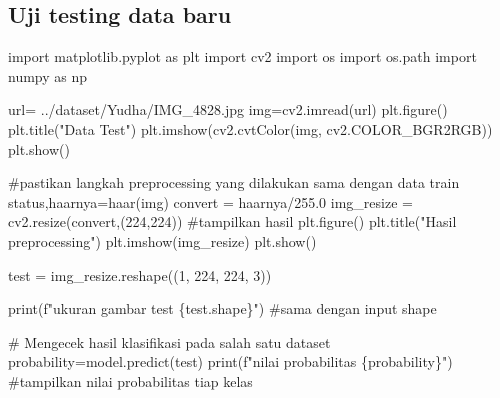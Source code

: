 \documentclass[
  letterpaper,
  DIV=11,
  numbers=noendperiod]{scrreprt}
\newenvironment{Shaded}{\begin{snugshade}}{\end{snugshade}}
\newcommand{\BuiltInTok}[1]{\textcolor[rgb]{0.00,0.23,0.31}{#1}}
\newcommand{\CommentTok}[1]{\textcolor[rgb]{0.37,0.37,0.37}{#1}}
\newcommand{\DecValTok}[1]{\textcolor[rgb]{0.68,0.00,0.00}{#1}}
\newcommand{\FloatTok}[1]{\textcolor[rgb]{0.68,0.00,0.00}{#1}}
\newcommand{\ImportTok}[1]{\textcolor[rgb]{0.00,0.46,0.62}{#1}}
\newcommand{\NormalTok}[1]{\textcolor[rgb]{0.00,0.23,0.31}{#1}}
\newcommand{\OperatorTok}[1]{\textcolor[rgb]{0.37,0.37,0.37}{#1}}
\newcommand{\SpecialCharTok}[1]{\textcolor[rgb]{0.37,0.37,0.37}{#1}}
\newcommand{\SpecialStringTok}[1]{\textcolor[rgb]{0.13,0.47,0.30}{#1}}
\newcommand{\StringTok}[1]{\textcolor[rgb]{0.13,0.47,0.30}{#1}}
\begin{document}
\hypertarget{uji-testing-data-baru-1}{%
\subsection*{Uji testing data baru}\label{uji-testing-data-baru-1}}

\begin{Shaded}
\begin{Highlighting}[]
\ImportTok{import}\NormalTok{ matplotlib.pyplot }\ImportTok{as}\NormalTok{ plt}
\ImportTok{import}\NormalTok{ cv2}
\ImportTok{import}\NormalTok{ os}
\ImportTok{import}\NormalTok{ os.path}
\ImportTok{import}\NormalTok{ numpy }\ImportTok{as}\NormalTok{ np}

\NormalTok{url}\OperatorTok{=} \StringTok{\textquotesingle{}../dataset/Yudha/IMG\_4828.jpg\textquotesingle{}}
\NormalTok{img}\OperatorTok{=}\NormalTok{cv2.imread(url)}
\NormalTok{plt.figure()}
\NormalTok{plt.title(}\StringTok{"Data Test"}\NormalTok{)}
\NormalTok{plt.imshow(cv2.cvtColor(img, cv2.COLOR\_BGR2RGB))}
\NormalTok{plt.show()}

\CommentTok{\#pastikan langkah preprocessing yang dilakukan sama dengan data train}
\NormalTok{status,haarnya}\OperatorTok{=}\NormalTok{haar(img)}
\NormalTok{convert }\OperatorTok{=}\NormalTok{ haarnya}\OperatorTok{/}\FloatTok{255.0}
\NormalTok{img\_resize }\OperatorTok{=}\NormalTok{ cv2.resize(convert,(}\DecValTok{224}\NormalTok{,}\DecValTok{224}\NormalTok{))}
\CommentTok{\#tampilkan hasil}
\NormalTok{plt.figure()}
\NormalTok{plt.title(}\StringTok{"Hasil preprocessing"}\NormalTok{)}
\NormalTok{plt.imshow(img\_resize)}
\NormalTok{plt.show()}

\NormalTok{test }\OperatorTok{=}\NormalTok{ img\_resize.reshape((}\DecValTok{1}\NormalTok{, }\DecValTok{224}\NormalTok{, }\DecValTok{224}\NormalTok{, }\DecValTok{3}\NormalTok{))}

\BuiltInTok{print}\NormalTok{(}\SpecialStringTok{f"ukuran gambar test }\SpecialCharTok{\{}\NormalTok{test}\SpecialCharTok{.}\NormalTok{shape}\SpecialCharTok{\}}\SpecialStringTok{"}\NormalTok{) }\CommentTok{\#sama dengan input shape}

\CommentTok{\# Mengecek hasil klasifikasi pada salah satu dataset}
\NormalTok{probability}\OperatorTok{=}\NormalTok{model.predict(test)}
\BuiltInTok{print}\NormalTok{(}\SpecialStringTok{f"nilai probabilitas }\SpecialCharTok{\{}\NormalTok{probability}\SpecialCharTok{\}}\SpecialStringTok{"}\NormalTok{) }\CommentTok{\#tampilkan nilai probabilitas tiap kelas}




\end{Highlighting}
\end{Shaded}
\end{document}
